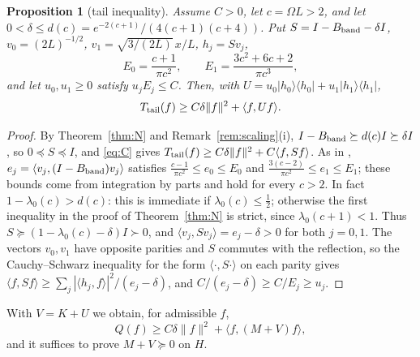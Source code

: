 \documentclass[11pt]{amsart}
\newtheorem{proposition}{Proposition}[section]
\theoremstyle{remark}
\numberwithin{equation}{section}
\begin{document}
\begin{proposition}[tail inequality]\label{prop:tail}
Assume $C>0$, let $c=\Omega L>2$, and let $0<\delta\le d(c)=e^{-2(c+1)}/(4(c+1)(c+4))$. Put $S=I-B_{\rm band}-\delta I$, $v_0=(2L)^{-1/2}$, $v_1=\sqrt{3/(2L)}\,x/L$, $h_j=Sv_j$,
\[
E_0=\frac{c+1}{\pi c^2},\qquad E_1=\frac{3c^2+6c+2}{\pi c^3},
\]
and let $u_0,u_1\ge0$ satisfy $u_jE_j\le C$. Then, with $U=u_0|h_0\rangle\langle h_0|+u_1|h_1\rangle\langle h_1|$,
\[
T_{\rm tail}(f)\ge C\delta\|f\|^2+\langle f,Uf\rangle .
\]
\end{proposition}
\begin{proof}
By Theorem~\ref{thm:N} and Remark~\ref{rem:scaling}(i), $I-B_{\rm band}\succeq d(c)I\succeq\delta I$, so $0\preceq S\preceq I$, and \eqref{eq:C} gives $T_{\rm tail}(f)\ge C\delta\|f\|^2+C\langle f,Sf\rangle$. As in \cite[Proposition~3.4]{MoriVI}, $e_j=\langle v_j,(I-B_{\rm band})v_j\rangle$ satisfies $\frac{c-1}{\pi c^2}\le e_0\le E_0$ and $\frac{3(c-2)}{\pi c^2}\le e_1\le E_1$; these bounds come from integration by parts and hold for every $c>2$. In fact $1-\lambda_0(c)>d(c)$: this is immediate if $\lambda_0(c)\le\frac12$; otherwise the first inequality in the proof of Theorem~\ref{thm:N} is strict, since $\lambda_0(c+1)<1$. Thus $S\succeq(1-\lambda_0(c)-\delta)I\succ0$, and $\langle v_j,Sv_j\rangle=e_j-\delta>0$ for both $j=0,1$. The vectors $v_0,v_1$ have opposite parities and $S$ commutes with the reflection, so the Cauchy--Schwarz inequality for the form $\langle\cdot,S\cdot\rangle$ on each parity gives $\langle f,Sf\rangle\ge\sum_j|\langle h_j,f\rangle|^2/(e_j-\delta)$, and $C/(e_j-\delta)\ge C/E_j\ge u_j$.
\end{proof}

With $V=K+U$ we obtain, for admissible $f$,
\begin{equation}\label{eq:reduction}
Q(f)\ge C\delta\|f\|^2+\langle f,(M+V)f\rangle ,
\end{equation}
and it suffices to prove $M+V\succeq0$ on $H$.
\end{document}
